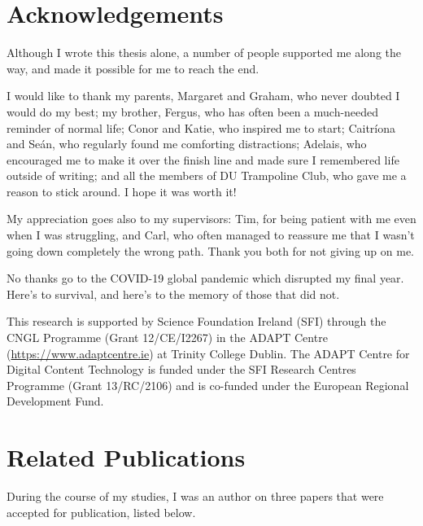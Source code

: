 \documentclass[a4paper,12pt,leqno]{article}
\begin{document}
\newpage
\section*{Acknowledgements}
Although I wrote this thesis alone, a number of people supported me along the way, and made it possible for me to reach the end.

I would like to thank my parents, Margaret and Graham, who never doubted I would do my best; my brother, Fergus, who has often been a much-needed reminder of normal life; Conor and Katie, who inspired me to start; Caitr\'{i}ona and Se\'{a}n, who regularly found me comforting distractions; Adelais, who encouraged me to make it over the finish line and made sure I remembered life outside of writing; and all the members of DU Trampoline Club, who gave me a reason to stick around. I hope it was worth it!

My appreciation goes also to my supervisors: Tim, for being patient with me even when I was struggling, and Carl, who often managed to reassure me that I wasn't going down completely the wrong path. Thank you both for not giving up on me.

No thanks go to the COVID-19 global pandemic which disrupted my final year. Here's to survival, and here's to the memory of those that did not.

This research is supported by Science Foundation Ireland (SFI) through the CNGL 
Programme (Grant 12/CE/I2267) in the ADAPT Centre 
(\url{https://www.adaptcentre.ie}) at Trinity College Dublin. The
ADAPT Centre for Digital Content Technology is funded under the SFI Research 
Centres Programme (Grant 13/RC/2106) and is co-funded under the European 
Regional Development Fund.


\newpage
\section*{Related Publications}
During the course of my studies, I was an author on three papers that were accepted for publication, listed below.
\end{document}
